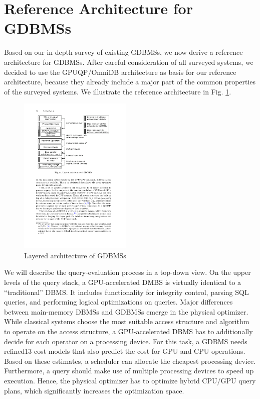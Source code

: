 \documentclass[twocolumn]{article}
\begin{document}
\section{Reference Architecture for GDBMSs}
Based on our in-depth survey of existing GDBMSs, we now derive a reference architecture for GDBMSs. After careful consideration of all surveyed systems, we decided to use the GPUQP/OmniDB \cite{Zhang:2013} architecture as basis for our reference architecture, because they already include a major part of the common properties of the surveyed systems. We illustrate the reference architecture in Fig. \ref{fig:gdbms}.
\begin{figure}[htb]
        \centering
        \includegraphics[width=0.48\textwidth]{gdbms.pdf}
        \caption{Layered architecture of GDBMSs}
        \label{fig:gdbms}
\end{figure}

We will describe the query-evaluation process in a top-down view. On the upper levels of the query stack, a GPU-accelerated DMBS is virtually identical to a “traditional” DBMS. It includes functionality for integrity control, parsing SQL queries, and performing logical optimizations on queries. Major differences between main-memory DBMSs and GDBMSs emerge in the physical optimizer. While classical systems choose the most suitable access structure and algorithm to operate on the access structure, a GPU-accelerated DBMS has to additionally decide for each operator on a processing device. For this task, a GDBMS needs refined13 cost models that also predict the cost for GPU and CPU operations. Based on these estimates, a scheduler can allocate the cheapest processing device. Furthermore, a query should make use of multiple processing devices to speed up execution. Hence, the physical optimizer has to optimize hybrid CPU/GPU query plans, which significantly increases the optimization space.
\end{document}
